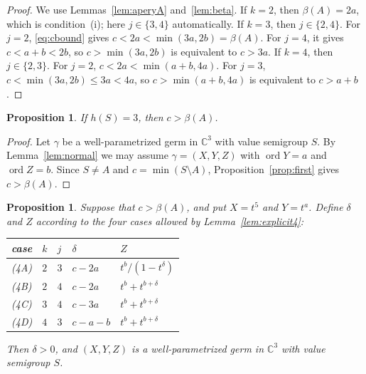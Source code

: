 \documentclass{amsart}
\newtheorem{proposition}[theorem]{Proposition}
\theoremstyle{definition}
\theoremstyle{remark}
\numberwithin{equation}{section}
\newcommand{\C}{\mathbb{C}}
\newcommand{\ord}{\operatorname{ord}}
\begin{document}
\begin{proof}
We use Lemmas~\ref{lem:aperyA} and~\ref{lem:beta}. If $k=2$, then $\beta(A)=2a$, which is condition~(i); here $j\in\{3,4\}$ automatically. If $k=3$, then $j\in\{2,4\}$. For $j=2$, \eqref{eq:cbound} gives $c<2a<\min(3a,2b)=\beta(A)$. For $j=4$, it gives $c<a+b<2b$, so $c>\min(3a,2b)$ is equivalent to $c>3a$. If $k=4$, then $j\in\{2,3\}$. For $j=2$, $c<2a<\min(a+b,4a)$. For $j=3$, $c<\min(3a,2b)\le3a<4a$, so $c>\min(a+b,4a)$ is equivalent to $c>a+b$.
\end{proof}

\begin{proposition}\label{prop:nec4}
If $h(S)=3$, then $c>\beta(A)$.
\end{proposition}

\begin{proof}
Let $\gamma$ be a well-parametrized germ in $\C^3$ with value semigroup $S$. By Lemma~\ref{lem:normal} we may assume $\gamma=(X,Y,Z)$ with $\ord Y=a$ and $\ord Z=b$. Since $S\ne A$ and $c=\min(S\setminus A)$, Proposition~\ref{prop:first} gives $c>\beta(A)$.
\end{proof}

\begin{proposition}\label{prop:real4}
Suppose that $c>\beta(A)$, and put $X=t^5$ and $Y=t^a$. Define $\delta$ and $Z$ according to the four cases allowed by Lemma~\textup{\ref{lem:explicit4}}:
\begin{center}
\begin{tabular}{lllll}
\toprule
case & $k$ & $j$ & $\delta$ & $Z$\\
\midrule
\textup{(4A)} & $2$ & $3$ & $c-2a$ & $t^b/(1-t^\delta)$\\
\textup{(4B)} & $2$ & $4$ & $c-2a$ & $t^b+t^{b+\delta}$\\
\textup{(4C)} & $3$ & $4$ & $c-3a$ & $t^b+t^{b+\delta}$\\
\textup{(4D)} & $4$ & $3$ & $c-a-b$ & $t^b+t^{b+\delta}$\\
\bottomrule
\end{tabular}
\end{center}
Then $\delta>0$, and $(X,Y,Z)$ is a well-parametrized germ in $\C^3$ with value semigroup $S$.
\end{proposition}
\end{document}
